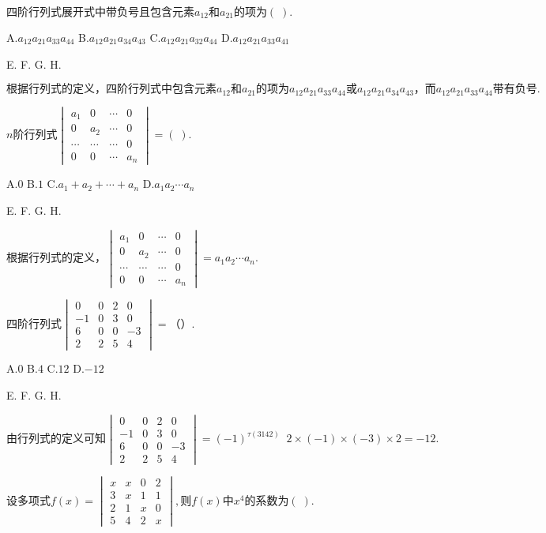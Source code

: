 $\mathrm{四阶行列式展开式中带负号且包含元素}a_{12}和a_{21}\mathrm{的项为}(\;).$

A.$a_{12}a_{21}a_{33}a_{44}$   B.$a_{12}a_{21}a_{34}a_{43}$   C.$a_{12}a_{21}a_{32}a_{44}$   D.$a_{12}a_{21}a_{33}a_{41}$

E.   F.   G.   H.

$\mathrm{根据行列式的定义}，\mathrm{四阶行列式中包含元素}a_{12}和a_{21}\mathrm{的项为}a_{12}a_{21}a_{33}a_{44}或a_{12}a_{21}a_{34}a_{43}，而a_{12}a_{21}a_{33}a_{44}\mathrm{带有负号}.$


$n\mathrm{阶行列式}\begin{vmatrix}a_1&0&\cdots&0\\0&a_2&\cdots&0\\\cdots&\cdots&\cdots&0\\0&0&\cdots&a_n\end{vmatrix}=(\;).$

A.$0$   B.$1$   C.$a_1+a_2+\cdots+a_n$   D.$a_1a_2\cdots a_n$

E.   F.   G.   H.

$\mathrm{根据行列式的定义}，\begin{vmatrix}a_1&0&\cdots&0\\0&a_2&\cdots&0\\\cdots&\cdots&\cdots&0\\0&0&\cdots&a_n\end{vmatrix}=a_1a_2\cdots a_n.$


$\mathrm{四阶行列式}\begin{vmatrix}0&0&2&0\\-1&0&3&0\\6&0&0&-3\\2&2&5&4\end{vmatrix}=（）.$

A.$0$   B.$4$   C.$12$   D.$-12$

E.   F.   G.   H.

$\mathrm{由行列式的定义可知}\begin{vmatrix}0&0&2&0\\-1&0&3&0\\6&0&0&-3\\2&2&5&4\end{vmatrix}=(-1)^{\tau(3142)}\;\;2\times(-1)\times(-3)\times2=-12.$


$\mathrm{设多项式}f(x)=\begin{vmatrix}x&x&0&2\\3&x&1&1\\2&1&x&0\\5&4&2&x\end{vmatrix},则f(x)中x^4\mathrm{的系数为}(\;).$

